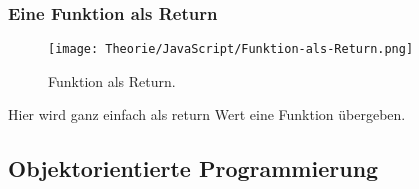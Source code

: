 \begin{center}
    \subsubsection{Eine Funktion als Return}
\begin{figure}[htbp]
    \centerline{\texttt{[image: Theorie/JavaScript/Funktion-als-Return.png]}}
    \caption{Funktion als Return.~\cite{First-Class-Funktion}}
\end{figure}
\end{center}
Hier wird ganz einfach als return Wert eine Funktion übergeben.


\subsection{Objektorientierte Programmierung}






